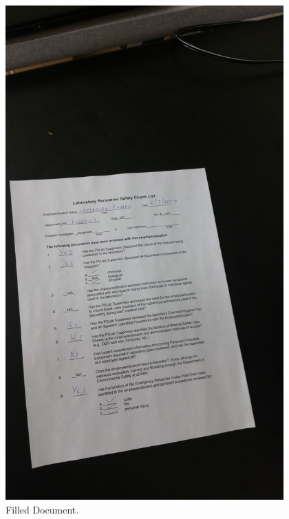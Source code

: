 \begin{figure}[th]
	\centering
	\includegraphics[height=19cm ]{Figures/filled_document1}
	\caption[Filled Document]{Filled Document.}
	\label{fig:FilledDocument}
\end{figure}
\pagebreak
